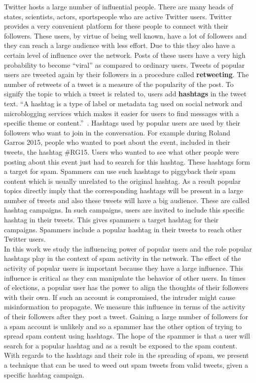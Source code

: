 \documentclass[journal, a4paper, 12pt]{article}
\begin{document}
Twitter hosts a large number of influential people. There are many heads of states, scientists, actors, sportspeople who are active Twitter users. Twitter provides a very convenient platform for these people to connect with their followers. These users, by virtue of being well known, have a lot of followers and they can reach a large audience with less effort. Due to this they also have a certain level of influence over the network. Posts of these users have a very high probability to become ``viral'' as compared to ordinary users. Tweets of popular users are tweeted again by their followers in a procedure called \textbf{retweeting}. The number of retweets of a tweet is a measure of the popularity of the post. To signify the topic to which a tweet is related to, users add \textbf{hashtags} in the tweet text. ``A hashtag is a type of label or metadata tag used on social network and microblogging services which makes it easier for users to find messages with a specific theme or content.''~\cite{wikihashtag}. Hashtags used by popular users are used by their followers who want to join in the conversation. For example during Roland Garros 2015, people who wanted to post about the event, included in their tweets, the hashtag \#RG15. Users who wanted to see what other people were posting about this event just had to search for this hashtag. These hashtags form a target for spam. Spammers can use such hashtags to piggyback their spam content which is usually unrelated to the original hashtag. As a result popular topics directly imply that the corresponding hashtags will be present in a large number of tweets and also these tweets will have a big audience. These are called hashtag campaigns. In such campaigns, users are invited to include this specific hashtag in their tweets. This gives spammers a target hashtag for their campaigns. Spammers include a popular hashtag in their tweets to reach other Twitter users. \\

In this work we study the influencing power of popular users and the role popular hashtags play in the context of spam activity in the network. The effect of the activity of popular users is important because they have a large influence. This influence is critical as they can manipulate the behavior of other users. In times of elections, a popular user has the power to align the thoughts of their followers with their own. If such an account is compromised, the intruder might cause misinformation to propagate. We measure this influence in terms of the activity of their followers after they post a tweet. Gaining a large number of followers for a spam account is unlikely and so a spammer has the other option of trying to spread spam content using hashtags. The hope of the spammer is that a user will search for a popular hashtag and as a result be exposed to the spam content. With regards to the hashtags and their role in the spreading of spam, we present a technique that can be used to weed out spam tweets from valid tweets, given a specific hashtag campaign. \\
\end{document}
